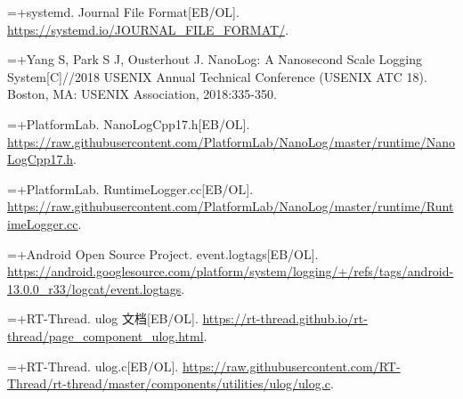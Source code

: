 {\noindent\hangindent=\dimexpr\thesisrefnumwd+\thesisrefgap\relax{}\makebox[\thesisrefnumwd][l]{[7]}\nobreak\hspace{\thesisrefgap}systemd. Journal File Format{[}EB/OL{]}. \url{https://systemd.io/JOURNAL_FILE_FORMAT/}.\par

\noindent\hangindent=\dimexpr\thesisrefnumwd+\thesisrefgap\relax{}\makebox[\thesisrefnumwd][l]{[8]}\nobreak\hspace{\thesisrefgap}Yang S, Park S J, Ousterhout J. NanoLog: A Nanosecond Scale Logging System{[}C{]}//2018 USENIX Annual Technical Conference (USENIX ATC 18). Boston, MA: USENIX Association, 2018:335-350.\par

\noindent\hangindent=\dimexpr\thesisrefnumwd+\thesisrefgap\relax{}\makebox[\thesisrefnumwd][l]{[9]}\nobreak\hspace{\thesisrefgap}PlatformLab. NanoLogCpp17.h{[}EB/OL{]}. \url{https://raw.githubusercontent.com/PlatformLab/NanoLog/master/runtime/NanoLogCpp17.h}.\par

\noindent\hangindent=\dimexpr\thesisrefnumwd+\thesisrefgap\relax{}\makebox[\thesisrefnumwd][l]{[10]}\nobreak\hspace{\thesisrefgap}PlatformLab. RuntimeLogger.cc{[}EB/OL{]}. \url{https://raw.githubusercontent.com/PlatformLab/NanoLog/master/runtime/RuntimeLogger.cc}.\par

\noindent\hangindent=\dimexpr\thesisrefnumwd+\thesisrefgap\relax{}\makebox[\thesisrefnumwd][l]{[11]}\nobreak\hspace{\thesisrefgap}Android Open Source Project. event.logtags{[}EB/OL{]}. \url{https://android.googlesource.com/platform/system/logging/+/refs/tags/android-13.0.0_r33/logcat/event.logtags}.\par

\noindent\hangindent=\dimexpr\thesisrefnumwd+\thesisrefgap\relax{}\makebox[\thesisrefnumwd][l]{[12]}\nobreak\hspace{\thesisrefgap}RT-Thread. ulog 文档{[}EB/OL{]}. \url{https://rt-thread.github.io/rt-thread/page_component_ulog.html}.\par

\noindent\hangindent=\dimexpr\thesisrefnumwd+\thesisrefgap\relax{}\makebox[\thesisrefnumwd][l]{[13]}\nobreak\hspace{\thesisrefgap}RT-Thread. ulog.c{[}EB/OL{]}. \url{https://raw.githubusercontent.com/RT-Thread/rt-thread/master/components/utilities/ulog/ulog.c}.\par

}

